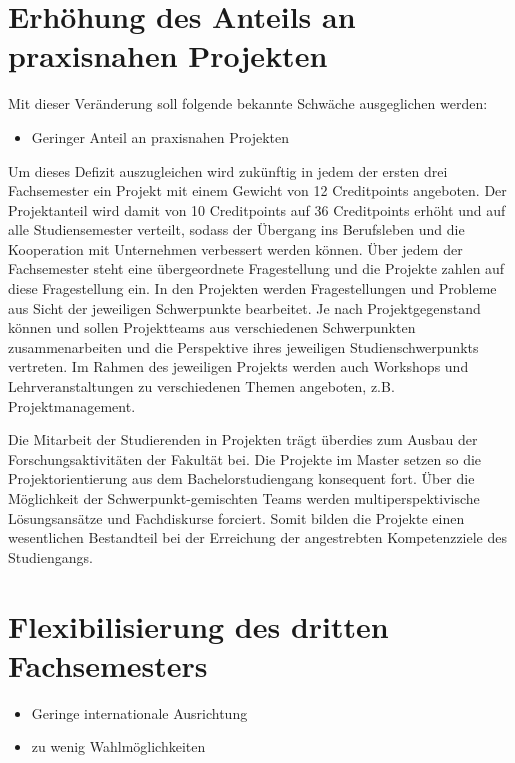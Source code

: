 \section{Erhöhung des Anteils an praxisnahen
Projekten}\label{erhuxf6hung-des-anteils-an-praxisnahen-projekten}

Mit dieser Veränderung soll folgende bekannte Schwäche ausgeglichen
werden:

\begin{itemize}
\tightlist
\item
  Geringer Anteil an praxisnahen Projekten
\end{itemize}

Um dieses Defizit auszugleichen wird zukünftig in jedem der ersten drei
Fachsemester ein Projekt mit einem Gewicht von 12 Creditpoints
angeboten. Der Projektanteil wird damit von 10 Creditpoints auf 36
Creditpoints erhöht und auf alle Studiensemester verteilt, sodass der
Übergang ins Berufsleben und die Kooperation mit Unternehmen verbessert
werden können. Über jedem der Fachsemester steht eine übergeordnete
Fragestellung und die Projekte zahlen auf diese Fragestellung ein. In
den Projekten werden Fragestellungen und Probleme aus Sicht der
jeweiligen Schwerpunkte bearbeitet. Je nach Projektgegenstand können und
sollen Projektteams aus verschiedenen Schwerpunkten zusammenarbeiten und
die Perspektive ihres jeweiligen Studienschwerpunkts vertreten. Im
Rahmen des jeweiligen Projekts werden auch Workshops und
Lehrveranstaltungen zu verschiedenen Themen angeboten, z.B.
Projektmanagement.

Die Mitarbeit der Studierenden in Projekten trägt überdies zum Ausbau
der Forschungsaktivitäten der Fakultät bei. Die Projekte im Master
setzen so die Projektorientierung aus dem Bachelorstudiengang konsequent
fort. Über die Möglichkeit der Schwerpunkt-gemischten Teams werden
multiperspektivische Lösungsansätze und Fachdiskurse forciert. Somit
bilden die Projekte einen wesentlichen Bestandteil bei der Erreichung
der angestrebten Kompetenzziele des Studiengangs.

\section{Flexibilisierung des dritten
Fachsemesters}\label{flexibilisierung-des-dritten-fachsemesters}

\begin{itemize}
\tightlist
\item
  Geringe internationale Ausrichtung
\item
  zu wenig Wahlmöglichkeiten
\end{itemize}

